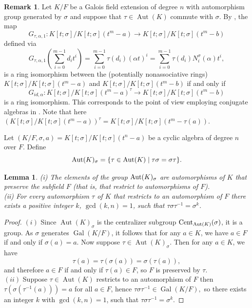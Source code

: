 \documentclass{amsart}
\theoremstyle{plain}
\newtheorem{lemma}[theorem]{Lemma}
\theoremstyle{definition}
\newtheorem{remark}[theorem]{Remark}
\numberwithin{equation}{section}
\numberwithin{figure}{section}
\DeclareMathOperator{\Gal}{Gal}
\DeclareMathOperator{\Aut}{Aut}
\begin{document}
\begin{remark}
Let $K/F$ be a Galois field extension of degree $n$ with automorphism group generated by $\sigma$ and suppose that $\tau\in \Aut(K)$ commute with $\sigma$. By \cite[Theorem  4.4]{Pum2025}, the map
$$G_{\tau,\alpha,1}:K[t;\sigma]/K[t;\sigma](t^m-a)\to K[t;\sigma]/K[t;\sigma](t^m-b)$$
 defined via
$$ G_{\tau,\alpha,1}(\sum_{i=0}^{m-1}d_it^i)=\sum_{i=0}^{m-1}\tau(d_i) (\alpha t)^i= \sum_{i=0}^{m-1}\tau(d_i) N_i^\sigma(\alpha) t^i,$$
is a ring isomorphism between the (potentially  nonassociative  rings) $K[t;\sigma]/K[t;\sigma](t^m-a)$ and $K[t;\sigma]/K[t;\sigma](t^m-b)$ if and only if
 $$G_{id,\alpha}: K[t;\sigma]/K[t;\sigma](t^m-a)^\tau\to K[t;\sigma]/K[t;\sigma](t^m-b)$$
  is a   ring isomorphism.
  This corresponds to the point of view employing conjugate algebras in \cite[p. 2]{MST}. Note that here  $(K[t;\sigma]/K[t;\sigma](t^m-a))^\tau = K[t;\sigma]/K[t;\sigma](t^m-\tau(a))$.
  \end{remark}



Let $(K/F,\sigma,a)=K[t;\sigma]/K[t;\sigma](t^n-a)$ be a cyclic algebra of degree $n$ over $F$.
Define
$$
{\rm Aut}(K)_\sigma=\{\tau\in {\rm Aut}(K) \mid \tau \sigma = \sigma \tau\}.
$$


\begin{lemma}\label{le:degreek}
  (i)  The elements of the group ${\rm Aut}(K)_\sigma$ are
     automorphisms of $K$ that preserve the subfield $F$ (that is, that restrict to automorphisms of $F$).
     \\ (ii) For every automorphism $\tau$ of $K$ that restricts to an automorphism of $F$ there exists a positive integer $k$, $\gcd(k,n)=1$, such that $\tau\sigma\tau^{-1}=\sigma^k$.
\end{lemma}

\begin{proof}
$(i)$ Since $\Aut(K)_\sigma$ is the centralizer subgroup ${\rm Cent}_{\Aut(K)}(\sigma)$, it is a group.  As $\sigma$ generates $\Gal(K/F)$, it follows that for any $a\in K$, we have $a\in F$ if and only if $\sigma(a)=a$.  Now suppose $\tau\in \Aut(K)_\sigma$.  Then for any $a\in K$, we have
$$
\tau(a) = \tau(\sigma(a))=\sigma(\tau(a)),
$$
and therefore $a\in F$ if and only if $\tau(a)\in F$, so $F$ is preserved by $\tau$.
\\ $(ii)$  Suppose $\tau\in \Aut(K)$  restricts to an automorphism of $F$ then  $\tau(\sigma(\tau^{-1}(a)))=a$ for all $a\in F$, hence $\tau\sigma\tau^{-1}\in \Gal (K/F),$ so there exists an integer $k$ with $\gcd(k,n)=1$, such that
$\tau\sigma\tau^{-1}=\sigma^k$.
\end{proof}
\end{document}
